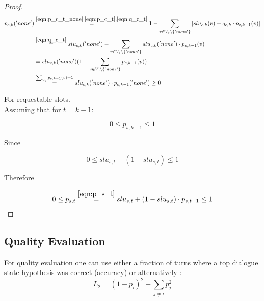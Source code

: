 \documentclass[12pt,titlepage,a4paper]{article}
\begin{document}
\begin{proof}
    \begin{equation}
        \begin{aligned}
            p_{c,k}('none') 
            &\overset{
                \mathrm{\ref{eqn:p_c_t_none}},
                \mathrm{\ref{eqn:p_c_t}}, 
                \mathrm{\ref{eqn:q_c_t}}
                }{=} 1 - \sum_{v \in V_{c} \backslash \{'none'\}} \left[ slu_{c,k}(v) + q_{c,k} \cdot p_{c,k-1}(v) \right] \\ 
            &\overset{
                \mathrm{\ref{eqn:q_c_t}}
                }{=} slu_{c,k}('none') - \sum_{v \in V_{c} \backslash \{'none'\}} slu_{c,k}('none') \cdot p_{c,k-1}(v) \\ 
            &= slu_{c,k}('none')(1 - \sum_{v \in V_{c} \backslash \{'none'\}}p_{c, k-1}(v)) 
            \\
            &\overset{\sum_{V_c}p_{c, k-1}(v) = 1}{=} slu_{c,k}('none') \cdot p_{c, k-1}('none') \geq 0
        \end{aligned}
    \end{equation}

    For requestable slots. \\
    
    Assuming that for $t = k-1$:

    \begin{equation}
        0 \leq p_{s,k-1} \leq 1
    \end{equation}
    
    \noindent Since
    
    \begin{equation}
        0 \leq slu_{s,t} + (1 - slu_{s,t}) \leq 1
    \end{equation}

    \noindent Therefore

    \begin{equation}
        0 \leq p_{s,t} \overset{\ref{eqn:p_s_t}}{=} slu_{s,t} + (1 - slu_{s,t}) \cdot p_{s,t-1} \leq 1
    \end{equation}
\end{proof}

\subsection{Quality Evaluation}
For quality evaluation one can use either a fraction of turns where a top dialogue state hypothesis was correct (accuracy) or alternatively \cite{DST}:
\begin{equation}
    L_2 = (1-p_i)^2 + \sum_{j \neq i} p_j^2
    \label{l2}
\end{equation}
\end{document}
